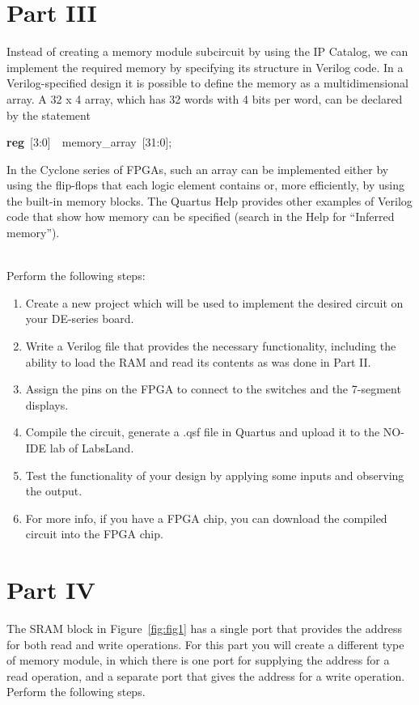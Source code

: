 \documentclass[epsfig,10pt,fullpage]{article}
\begin{document}
\section*{Part III}
Instead of creating a memory module subcircuit by using the IP Catalog, we can implement the 
required memory by specifying its structure in Verilog code.
In a Verilog-specified design it is possible to define the memory as a
multidimensional array. A 32 {\sf x} 4 array, which has 32 words with
4 bits per word, can be declared by the statement

\begin{center}
{\bf reg}~[3:0]~~memory\_array~[31:0];
\end{center}

In the Cyclone series of FPGAs, such an array can be implemented either by using
the flip-flops that each logic element contains or, more efficiently, 
by using the built-in memory blocks.
The Quartus Help provides other examples of Verilog code 
that show how memory can be specified (search in the Help for ``Inferred memory''). 

~\\
Perform the following steps:

\begin{enumerate}
\item Create a new project which will be used to implement the desired
circuit on your DE-series board.
\item Write a Verilog file that provides the necessary functionality,
including the ability to load the RAM and read its contents as was done in
Part II.
\item Assign the pins on the FPGA to connect to the switches and the 
7-segment displays.
\item Compile the circuit, generate a .qsf file in Quartus and upload it to the NO-IDE lab of LabsLand.
\item Test the functionality of your design by applying some inputs
and observing the output.
\item For more info, if you have a FPGA chip, you can download the compiled circuit into the FPGA chip.
\end{enumerate}

\section*{Part IV}
The SRAM block in Figure~\ref{fig:fig1} has a single port that provides the address for 
both read and write operations. For this part you will create a different type of memory module,
in which there is one port for supplying the address for a read operation, and a separate
port that gives the address for a write operation. Perform the following steps.
\end{document}
